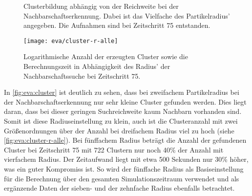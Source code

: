 \begin{figure}
	{\caption{Clusterbildung abhängig von der Reichweite bei der Nachbarschaftserkennung. Dabei ist das Vielfache des Partikelradius' angegeben. Die Aufnahmen sind bei Zeitschritt 75 entstanden.}\label{fig:eva:cluster}}
\end{figure}

\begin{figure}
	\texttt{[image: eva/cluster-r-alle]}
	\caption{Logarithmische Anzahl der erzeugten Cluster sowie die Berechnungszeit in Abhängigkeit des Radius' der Nachbarschaftssuche bei Zeitschritt 75.}\label{fig:eva:cluster-r-alle}
\end{figure}

In \autoref{fig:eva:cluster} ist deutlich zu sehen, dass bei zweifachem Partikelradius bei der Nachbarschaftserkennung nur sehr kleine Cluster gefunden werden. Dies liegt daran, dass bei dieser geringen Suchreichweite kaum Nachbarn vorhanden sind. Somit ist diese Radiuseinstellung zu klein, auch ist die Clusteranzahl mit zwei Größenordnungen über der Anzahl bei dreifachem Radius viel zu hoch (siehe \autoref{fig:eva:cluster-r-alle}). Bei fünffachem Radius beträgt die Anzahl der gefundenen Cluster bei Zeitschritt 75 mit 722 Clustern nur noch 40\% der Anzahl mit vierfachem Radius. Der Zeitaufwand liegt mit etwa 500 Sekunden nur 30\% höher, was ein guter Kompromiss ist. So wird der fünffache Radius als Basiseinstellung für die Berechnung über den gesamten Simulationszeitraum verwendet und als ergänzende Daten der sieben- und der zehnfache Radius ebenfalls betrachtet.

